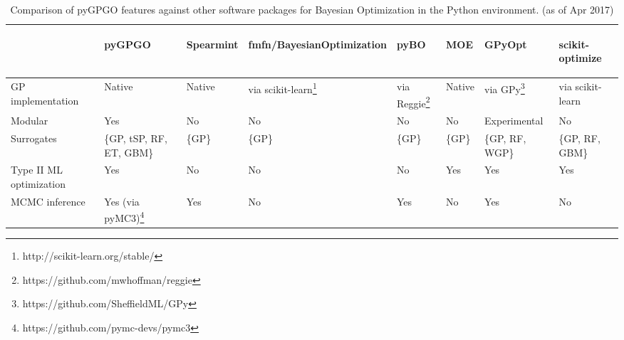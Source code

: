 \documentclass[10pt,a4paper,twoside]{book}
\begin{document}
\begin{table}
\centering
\caption{Comparison of pyGPGO features against other software packages for Bayesian Optimization in the Python environment. (as of Apr 2017)}
\label{featurecomp}
\begin{adjustbox}{width=1\textwidth}
\begin{tabular}{@{}llllllll@{}}
\toprule
                                   & \begin{sideways}pyGPGO\end{sideways}                   & \begin{sideways}Spearmint\end{sideways}  & \begin{sideways}fmfn/BayesianOptimization\end{sideways} & \begin{sideways}pyBO\end{sideways}        & \begin{sideways}MOE\end{sideways}    & \begin{sideways}GPyOpt\end{sideways}          & \begin{sideways}scikit-optimize\end{sideways}   \\ \midrule
GP implementation                  & Native                   & Native     & via scikit-learn\footnote{http://scikit-learn.org/stable/} & via Reggie\footnote{https://github.com/mwhoffman/reggie} & Native & via GPy\footnote{https://github.com/SheffieldML/GPy}        & via scikit-learn \\
Modular                            & \color{green}Yes                      & \color{red} No         & \color{red} No                        & \color{red} No         & \color{red} No    & Experimental    & \color{red} No               \\
Surrogates                         & \{GP, tSP, RF, ET, GBM\} & \{GP\}     & \{GP\}                    & \{GP\}      & \{GP\} & \{GP, RF, WGP\} & \{GP, RF, GBM\}   \\
Type II ML optimization            & \color{green} Yes                      &     \color{red} No       & \color{red} No                       & \color{red} No         &  \color{green} Yes      & \color{green} Yes             & \color{green} Yes               \\
MCMC inference                     & {\color{green} Yes} (via pyMC3)\footnote{https://github.com/pymc-devs/pymc3}          & \color{green} Yes        & \color{red} No                       & \color{green} Yes         & \color{red} No      & \color{green} Yes             &  \color{red} No                  \\

\end{tabular}
\end{adjustbox}
\end{table}
\end{document}
